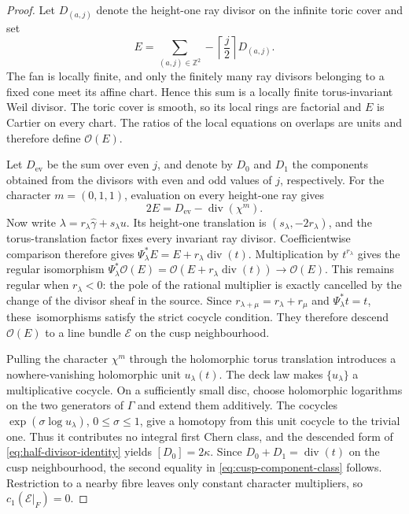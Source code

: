 \begin{proof}
Let $D_{(a,j)}$ denote the height-one ray divisor on the infinite toric
cover and set
\[
 E=\sum_{(a,j)\in\mathbb Z^2}
   -\left\lceil\frac j2\right\rceil D_{(a,j)}.
\]
The fan is locally finite, and only the finitely many ray divisors belonging
to a fixed cone meet its affine chart.  Hence this sum is a locally finite
torus-invariant Weil divisor.  The toric cover is smooth, so its local rings
are factorial and $E$ is Cartier on every chart.  The ratios of the local
equations on overlaps are units and therefore define $\mathcal O(E)$.

Let $D_{\mathrm{ev}}$ be the sum over even $j$, and denote by $D_0$
and $D_1$ the components obtained from the divisors with even and odd
values of $j$, respectively.  For the character
$m=(0,1,1)$, evaluation on every height-one ray gives
\begin{equation}\label{eq:half-divisor-identity}
 2E=D_{\mathrm{ev}}-\operatorname{div}(\chi^m).
\end{equation}
Now write $\lambda=r_\lambda\widehat\gamma+s_\lambda u$.  Its height-one translation
is $(s_\lambda,-2r_\lambda)$, and the torus-translation factor fixes every
invariant ray divisor.  Coefficientwise comparison therefore gives
$\Psi_\lambda^*E=E+r_\lambda\operatorname{div}(t)$.
Multiplication by $t^{r_\lambda}$ gives the regular isomorphism
$\Psi_\lambda^*\mathcal O(E)
=\mathcal O(E+r_\lambda\operatorname{div}(t))
\longrightarrow\mathcal O(E)$.
This remains regular when $r_\lambda<0$: the pole of the rational
multiplier is exactly cancelled by the change of the divisor sheaf in the
source.  Since $r_{\lambda+\mu}=r_\lambda+r_\mu$ and
$\Psi_\lambda^*t=t$, these~isomorphisms satisfy the strict cocycle
condition.  They therefore descend $\mathcal O(E)$ to a line bundle
$\mathcal E$ on the cusp neighbourhood.

Pulling the character $\chi^m$ through the holomorphic torus translation
introduces a nowhere-vanishing holomorphic unit $u_\lambda(t)$.  The deck
law makes $\{u_\lambda\}$ a multiplicative cocycle.  On a sufficiently
small disc, choose holomorphic logarithms on the two generators of
$\Gamma$ and extend them additively.  The cocycles
$\exp(\sigma\log u_\lambda)$, $0\leq\sigma\leq1$, give a homotopy from
this unit cocycle to the trivial one.  Thus it contributes no integral first
Chern class, and the descended form of
\eqref{eq:half-divisor-identity} yields $[D_0]=2\kappa$.  Since
$D_0+D_1=\operatorname{div}(t)$ on the cusp neighbourhood, the second equality in
\eqref{eq:cusp-component-class} follows.  Restriction to a nearby fibre
leaves only constant character multipliers, so $c_1(\mathcal E|_F)=0$.


\end{proof}
